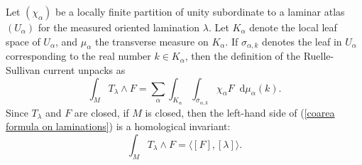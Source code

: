 \documentclass[reqno,11pt]{amsart}
\newcommand*\dif{\mathop{}\!\mathrm{d}}
\theoremstyle{definition}
\numberwithin{equation}{section}
\begin{document}
Let $(\chi_\alpha)$ be a locally finite partition of unity subordinate to a laminar atlas $(U_\alpha)$ for the measured oriented lamination $\lambda$.
Let $K_\alpha$ denote the local leaf space of $U_\alpha$, and $\mu_\alpha$ the transverse measure on $K_\alpha$.
If $\sigma_{\alpha, k}$ denotes the leaf in $U_\alpha$ corresponding to the real number $k \in K_\alpha$, then the definition of the Ruelle-Sullivan current unpacks as
\begin{equation}\label{coarea formula on laminations}
\int_M T_\lambda \wedge F = \sum_\alpha \int_{K_\alpha} \int_{\sigma_{\alpha, k}} \chi_\alpha F \dif \mu_\alpha(k).
\end{equation}
Since $T_\lambda$ and $F$ are closed, if $M$ is closed, then the left-hand side of (\ref{coarea formula on laminations}) is a homological invariant:
\begin{equation}\label{Ruelle Sullivan homology}
\int_M T_\lambda \wedge F = \langle [F], [\lambda]\rangle.
\end{equation}
\end{document}
